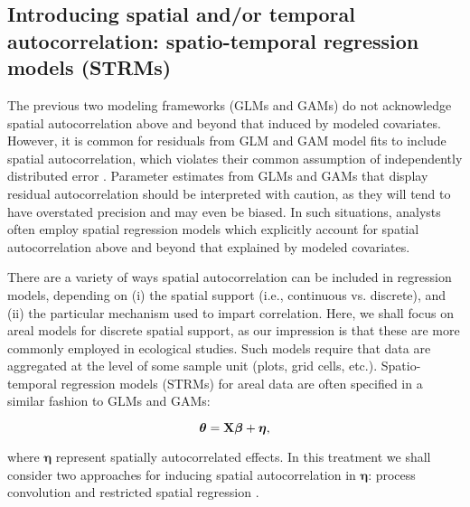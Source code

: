 \documentclass[12pt,fleqn]{article}
\begin{document}
\begin{flushleft}
\subsection{Introducing spatial and/or temporal autocorrelation: spatio-temporal regression models (STRMs)}

The previous two modeling frameworks (GLMs and GAMs) do not acknowledge spatial autocorrelation above and beyond that induced
by modeled covariates.  However, it is common for residuals from GLM and GAM model fits to include spatial autocorrelation, which violates their common assumption of independently distributed error \citep{Legendre1993,LichsteinEtAl2002}.  Parameter estimates from GLMs and GAMs that display residual autocorrelation should be interpreted with caution, as they will tend to have overstated precision and may even be biased.  In such situations, analysts often employ spatial regression models which explicitly account for spatial autocorrelation above and beyond that explained by modeled covariates.

There are a variety of ways spatial autocorrelation can be included in regression models, depending on (i) the spatial support (i.e., continuous vs. discrete), and (ii) the particular mechanism used to impart correlation.  Here, we shall focus on areal models for discrete spatial support, as our impression is that these are more commonly employed in ecological studies.  Such models require that data are aggregated at the level of some sample unit (plots, grid cells, etc.).  Spatio-temporal regression models (STRMs) for areal data are often specified in a similar fashion to GLMs and GAMs:
\begin{linenomath*}
\begin{equation}
  \label{eq:spat_reg}
  \boldsymbol{\theta}={\bf X} \boldsymbol{\beta} + \boldsymbol{\eta},
\end{equation}
\end{linenomath*}
where $\boldsymbol{\eta}$ represent spatially autocorrelated effects.  In this treatment we shall consider two approaches for
inducing spatial autocorrelation in $\boldsymbol{\eta}$: process convolution
\citep[PC;][]{Higdon1998} and restricted spatial regression \citep[RSR;][]{Reich2006,Hodges2010,Hughes2013}.


\end{flushleft}
\end{document}
